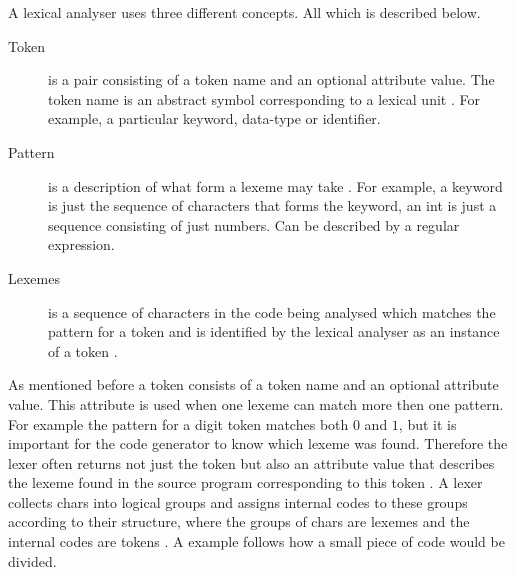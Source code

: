 A lexical analyser uses three different concepts. All which is described 
below. 
\begin{description}
  \item[Token]
    is a pair consisting of a token name and an optional attribute value. The 
token name is an abstract symbol corresponding to a lexical unit \cite{Aho2006}. 
For example, a particular keyword, data-type or identifier.
  \item[Pattern]
    is a description of what form a lexeme may take \cite{Aho2006}. 
For example, a keyword is just the sequence of characters that forms the 
keyword, an int is just a sequence consisting of just numbers. Can be described 
by a regular expression.
  \item[Lexemes]
    is a sequence of characters in the code being analysed which 
matches the pattern for a token and is identified by the lexical analyser as an 
instance of a token \cite{Aho2006}.
\end{description}
As mentioned before a token consists of a token name and an optional attribute value. 
This attribute is used when one lexeme can match more then one pattern. 
For example the pattern for a digit token matches both $0$ and $1$, 
but it is important for the code generator to know which lexeme was found. 
Therefore the lexer often returns not just the token but also an attribute value 
that describes the lexeme found in the source program corresponding to this 
token \cite{Aho2006}. A lexer collects chars into logical groups and assigns 
internal codes to these groups according to their structure, 
where the groups of chars are lexemes and the internal codes are tokens \cite{sebesta2012}. 
A example follows how a small piece of code would be divided.
